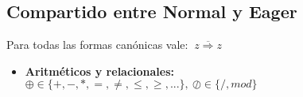 \documentclass[12pt,a4paper]{article}
\newcommand{\PN}{\par\noindent}
\newcommand{\ov}[1]{$\overline{\ #1 \ }$}
\begin{document}
    \subsection{Compartido entre Normal y Eager}
      \PN Para todas las formas canónicas vale: \ov{z \Rightarrow z}
      \begin{itemize}
        \item \textbf{Aritméticos y relacionales:} $\oplus\in \{+,-,*,=,\neq,\leq,\geq,...\}, \ \oslash \in \{/, mod\}$
          \begin{itemize}
\end{itemize}
\end{itemize}
\end{document}
